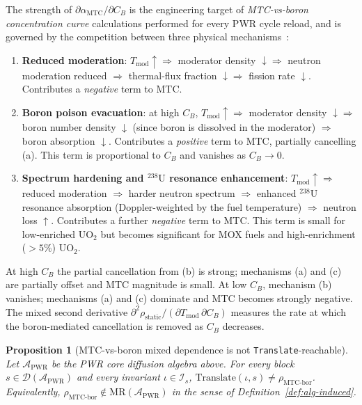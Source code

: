 \documentclass[acmsmall, screen]{acmart}
\newtheorem{proposition}{Proposition}
\begin{document}
The strength of $\partial \alpha_{\mathrm{MTC}}/\partial C_{B}$ is the engineering target of \emph{MTC-vs-boron concentration curve} calculations performed for every PWR cycle reload, and is governed by the competition between three physical mechanisms~\cite[\S3.4]{Stacey2007}:
\begin{enumerate}[nosep,leftmargin=*]
  \item[(a)] \textbf{Reduced moderation}: $T_{\mathrm{mod}} \uparrow \Rightarrow$ moderator density $\downarrow \Rightarrow$ neutron moderation reduced $\Rightarrow$ thermal-flux fraction $\downarrow \Rightarrow$ fission rate $\downarrow$. Contributes a \emph{negative} term to MTC.
  \item[(b)] \textbf{Boron poison evacuation}: at high $C_{B}$, $T_{\mathrm{mod}} \uparrow \Rightarrow$ moderator density $\downarrow \Rightarrow$ boron number density $\downarrow$ (since boron is dissolved in the moderator) $\Rightarrow$ boron absorption $\downarrow$. Contributes a \emph{positive} term to MTC, partially cancelling (a). This term is proportional to $C_{B}$ and vanishes as $C_{B} \to 0$.
  \item[(c)] \textbf{Spectrum hardening and $^{238}\mathrm{U}$ resonance enhancement}: $T_{\mathrm{mod}} \uparrow \Rightarrow$ reduced moderation $\Rightarrow$ harder neutron spectrum $\Rightarrow$ enhanced $^{238}\mathrm{U}$ resonance absorption (Doppler-weighted by the fuel temperature) $\Rightarrow$ neutron loss $\uparrow$. Contributes a further \emph{negative} term to MTC. This term is small for low-enriched UO$_{2}$ but becomes significant for MOX fuels and high-enrichment ($>5\%$) UO$_{2}$.
\end{enumerate}

At high $C_{B}$ the partial cancellation from (b) is strong; mechanisms (a) and (c) are partially offset and MTC magnitude is small. At low $C_{B}$, mechanism (b) vanishes; mechanisms (a) and (c) dominate and MTC becomes strongly negative. The mixed second derivative $\partial^{2}\rho_{\mathrm{static}}/(\partial T_{\mathrm{mod}}\,\partial C_{B})$ measures the rate at which the boron-mediated cancellation is removed as $C_{B}$ decreases.

\begin{proposition}[MTC-vs-boron mixed dependence is not \texttt{Translate}-reachable]
\label{prop:mtcbor}
Let $\mathcal{A}_{\mathrm{PWR}}$ be the PWR core diffusion algebra above. For every block $s \in \mathcal{D}(\mathcal{A}_{\mathrm{PWR}})$ and every invariant $\iota \in \mathcal{I}_{s}$, $\mathrm{Translate}(\iota, s) \neq \rho_{\mathrm{MTC\text{-}bor}}$. Equivalently, $\rho_{\mathrm{MTC\text{-}bor}} \notin \mathrm{MR}(\mathcal{A}_{\mathrm{PWR}})$ in the sense of Definition~\ref{def:alg-induced}.
\end{proposition}
\end{document}

